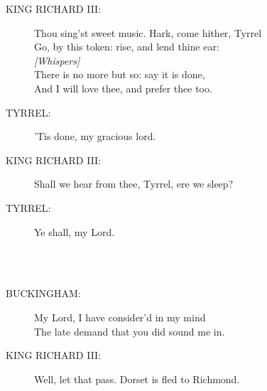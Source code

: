\documentclass{article}
\begin{document}
\begin{description}
\item[KING RICHARD III:] 
\hspace{1pt}Thou sing'st sweet music. Hark, come hither, Tyrrel\\
\hspace{1pt}Go, by this token: rise, and lend thine ear:\\
{\it [Whispers]}\\
\hspace{1pt}There is no more but so: say it is done,\\
\hspace{1pt}And I will love thee, and prefer thee too.\\
\end{description}
\begin{description}
\item[TYRREL:] 
\hspace{1pt}'Tis done, my gracious lord.\\
\end{description}
\begin{description}
\item[KING RICHARD III:] 
\hspace{1pt}Shall we hear from thee, Tyrrel, ere we sleep?\\
\end{description}
\begin{description}
\item[TYRREL:] 
\hspace{1pt}Ye shall, my Lord.\\
\end{description}
\centering{\it [Exit]}\\
\\
\begin{description}
\item[BUCKINGHAM:] 
\hspace{1pt}My Lord, I have consider'd in my mind\\
\hspace{1pt}The late demand that you did sound me in.\\
\end{description}
\begin{description}
\item[KING RICHARD III:] 
\hspace{1pt}Well, let that pass. Dorset is fled to Richmond.\\
\end{description}
\end{document}
